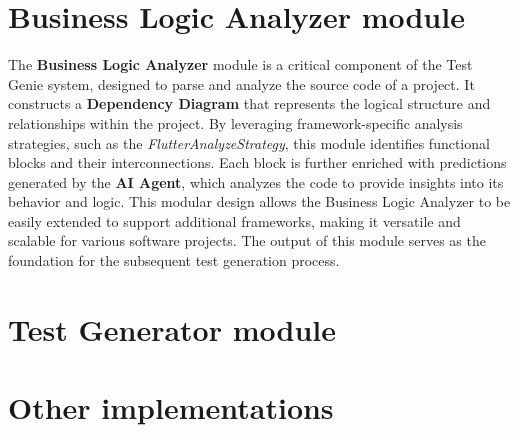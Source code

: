 \section{Business Logic Analyzer module}
The \textbf{Business Logic Analyzer} module is a critical component of the Test Genie system, designed to parse and analyze the source code of a project. It constructs a \textbf{Dependency Diagram} that represents the logical structure and relationships within the project. By leveraging framework-specific analysis strategies, such as the \textit{FlutterAnalyzeStrategy}, this module identifies functional blocks and their interconnections. Each block is further enriched with predictions generated by the \textbf{AI Agent}, which analyzes the code to provide insights into its behavior and logic. This modular design allows the Business Logic Analyzer to be easily extended to support additional frameworks, making it versatile and scalable for various software projects. The output of this module serves as the foundation for the subsequent test generation process.
\section{Test Generator module}

\section{Other implementations}